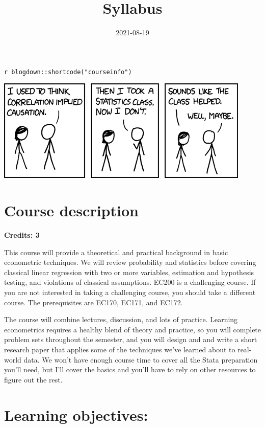 \documentclass[
]{article}
\title{Syllabus}
\author{}
\date{2021-08-19}
\begin{document}
\maketitle

\texttt{r\ blogdown::shortcode("courseinfo")}

\includegraphics{correlation.png}

\hypertarget{course-description}{%
\section*{Course description}\label{course-description}}

\textbf{Credits: 3}

This course will provide a theoretical and practical background in basic
econometric techniques. We will review probability and statistics before
covering classical linear regression with two or more variables,
estimation and hypothesis testing, and violations of classical
assumptions. EC200 is a challenging course. If you are not interested in
taking a challenging course, you should take a different course. The
prerequisites are EC170, EC171, and EC172.

The course will combine lectures, discussion, and lots of practice.
Learning econometrics requires a healthy blend of theory and practice,
so you will complete problem sets throughout the semester, and you will
design and and write a short research paper that applies some of the
techniques we've learned about to real-world data. We won't have enough
course time to cover all the Stata preparation you'll need, but I'll
cover the basics and you'll have to rely on other resources to figure
out the rest.

\hypertarget{learning-objectives}{%
\section*{Learning objectives:}\label{learning-objectives}}
\end{document}
